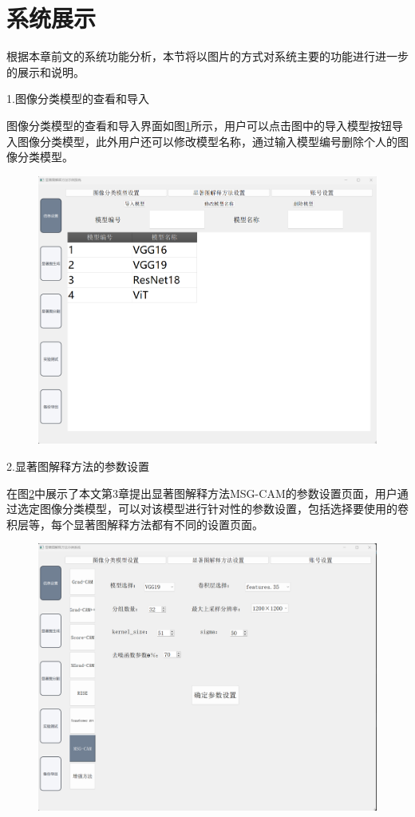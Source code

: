 \section{系统展示}
根据本章前文的系统功能分析，本节将以图片的方式对系统主要的功能进行进一步的展示和说明。

1.图像分类模型的查看和导入

图像分类模型的查看和导入界面如图\ref{fig:f1}所示，用户可以点击图中的导入模型按钮导入图像分类模型，此外用户还可以修改模型名称，通过输入模型编号删除个人的图像分类模型。
\begin{figure}[h]
	\centering 
	\includegraphics[width=12cm]{fig/ch5/f1.png}
	\label{fig:f1}
\end{figure}

2.显著图解释方法的参数设置

在图\ref{fig:f2}中展示了本文第3章提出显著图解释方法MSG-CAM的参数设置页面，用户通过选定图像分类模型，可以对该模型进行针对性的参数设置，包括选择要使用的卷积层等，每个显著图解释方法都有不同的设置页面。

\begin{figure}[h]
	\centering 
	\includegraphics[width=12cm]{fig/ch5/f2.png}
	\label{fig:f2}
\end{figure}

